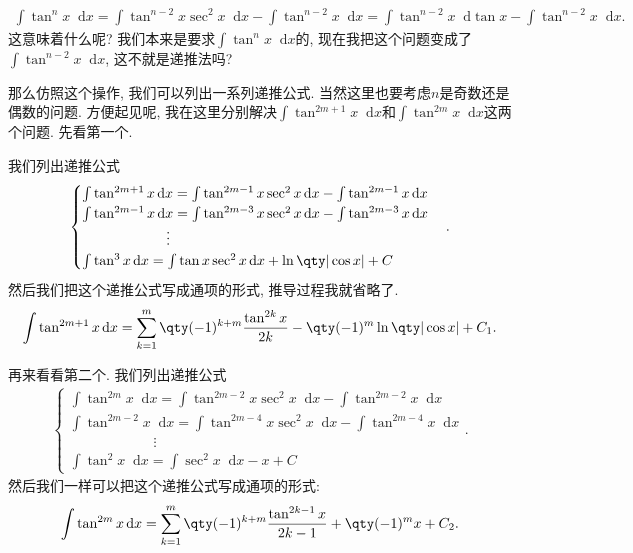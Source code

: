 \documentclass{ctexbook}
\newcommand*{\dif}{\mathop{}\!\mathrm{d}}
\begin{document}
{\begin{align*}
\int\tan^{n}{x}\dif{x}=\int\tan^{n-2}{x}\sec^{2}{x}\dif{x}-\int\tan^{n-2}{x}\dif{x}=\int\tan^{n-2}{x}\dif{\tan{x}}-\int\tan^{n-2}{x}\dif{x}
.\end{align*}
这意味着什么呢? 我们本来是要求$\int\tan^{n}{x}\dif{x}$的, 现在我把这个问题变成了$\int\tan^{n-2}{x}\dif{x}$, 这不就是递推法吗? \par
那么仿照这个操作, 我们可以列出一系列递推公式. 当然这里也要考虑$n$是奇数还是偶数的问题. 方便起见呢, 我在这里分别解决$\int\tan^{2m+1}{x}\dif{x}$和$\int\tan^{2m}{x}\dif{x}$这两个问题. 先看第一个. \par
我们列出递推公式
\begin{align*}
\begin{cases}
\int\tan^{2m+1}{x}\dif{x}=\int\tan^{2m-1}{x}\sec^{2}{x}\dif{x}-\int\tan^{2m-1}{x}\dif{x}\\
\int\tan^{2m-1}{x}\dif{x}=\int\tan^{2m-3}{x}\sec^{2}{x}\dif{x}-\int\tan^{2m-3}{x}\dif{x}\\
\qquad\qquad\qquad\vdots\\
\int\tan^{3}{x}\dif{x}=\int\tan{x}\sec^{2}{x}\dif{x}+\ln\qty|\cos{x}|+C
\end{cases}
.\end{align*}
然后我们把这个递推公式写成通项的形式, 推导过程我就省略了. 
\begin{align*}
\int\tan^{2m+1}{x}\dif{x}=\sum_{k=1}^{m}\qty(-1)^{k+m}\frac{\tan^{2k}{x}}{2k}-\qty(-1)^{m}\ln\qty|\cos{x}|+C_{1}
.\end{align*}\par
再来看看第二个. 我们列出递推公式
\begin{align*}
\begin{cases}
\int\tan^{2m}{x}\dif{x}=\int\tan^{2m-2}{x}\sec^{2}{x}\dif{x}-\int\tan^{2m-2}{x}\dif{x}\\
\int\tan^{2m-2}{x}\dif{x}=\int\tan^{2m-4}{x}\sec^{2}{x}\dif{x}-\int\tan^{2m-4}{x}\dif{x}\\
\qquad\qquad\qquad\vdots\\
\int\tan^{2}{x}\dif{x}=\int\sec^{2}{x}\dif{x}-x+C
\end{cases}
.\end{align*}
然后我们一样可以把这个递推公式写成通项的形式: 
\begin{align*}
\int\tan^{2m}{x}\dif{x}=\sum_{k=1}^{m}\qty(-1)^{k+m}\frac{\tan^{2k-1}{x}}{2k-1}+\qty(-1)^{m}x+C_{2}
.\end{align*}
}
\end{document}
